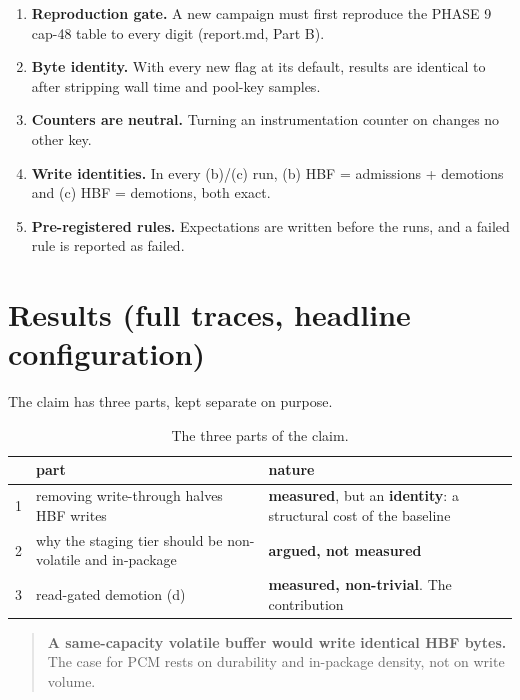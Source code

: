 \documentclass[11pt,a4paper]{article}
\newcommand{\hd}[1]{\textbf{#1}}
\begin{document}
\begin{enumerate}
  \item \textbf{Reproduction gate.} A new campaign must first reproduce the
    PHASE 9 cap-48 table to every digit (report.md, Part B).
  \item \textbf{Byte identity.} With every new flag at its default, results
    are identical to  after stripping wall time and pool-key
    samples.
  \item \textbf{Counters are neutral.} Turning an instrumentation counter on
    changes no other key.
  \item \textbf{Write identities.} In every (b)/(c) run, (b) HBF = admissions
    + demotions and (c) HBF = demotions, both exact.
  \item \textbf{Pre-registered rules.} Expectations are written before the
    runs, and a failed rule is reported as failed.
\end{enumerate}

\section{Results (full traces, headline configuration)}\label{sec:results}

The claim has three parts, kept separate on purpose.

\begin{xltabular}{\linewidth}{@{}c Y{1.1} Y{0.9}@{}}
\caption{The three parts of the claim.}\label{tab:claim}\\
\toprule
 & \hd{part} & \hd{nature} \\
 & removing write-through halves HBF writes & \textbf{measured}, but an \textbf{identity}: a structural cost of the baseline \\
2 & why the staging tier should be non-volatile and in-package & \textbf{argued, not measured} \\
3 & read-gated demotion (d) & \textbf{measured, non-trivial}. The contribution \\
\bottomrule
\end{xltabular}

\begin{quote}
\textbf{A same-capacity volatile buffer would write identical HBF bytes.} The
case for PCM rests on durability and in-package density, not on write volume.
\end{quote}
\end{document}
